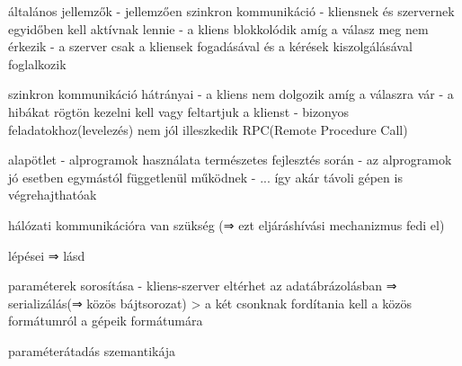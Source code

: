 \documentclass[12pt]{article}
\begin{document}
\begin{description}
                                                                    \item általános jellemzők
                                                                        - jellemzően szinkron kommunikáció
                                                                        - kliensnek és szervernek egyidőben kell aktívnak lennie
                                                                        - a kliens blokkolódik amíg a válasz meg nem érkezik
                                                                        - a szerver csak a kliensek fogadásával és a kérések kiszolgálásával foglalkozik
                                                                    \item szinkron kommunikáció hátrányai
                                                                        - a kliens nem dolgozik amíg a válaszra vár
                                                                        - a hibákat rögtön kezelni kell vagy feltartjuk a klienst
                                                                        - bizonyos feladatokhoz(levelezés) nem jól illeszkedik
                                                                        RPC(Remote Procedure Call)
                                                                    \item alapötlet
                                                                        - alprogramok használata természetes fejlesztés során
                                                                        - az alprogramok jó esetben egymástól függetlenül működnek
                                                                        - ... így akár távoli gépen is végrehajthatóak
                                                                    \item hálózati kommunikációra van szükség (⇒ ezt eljáráshívási mechanizmus fedi el)
                                                                    \item lépései ⇒ lásd 
                                                                    \item paraméterek sorosítása
                                                                        - kliens-szerver eltérhet az adatábrázolásban ⇒ serializálás(⇒ közös bájtsorozat)
                                                                        > a két csonknak fordítania kell a közös formátumról a gépeik formátumára
                                                                    \item paraméterátadás szemantikája

\end{description}
\end{document}
